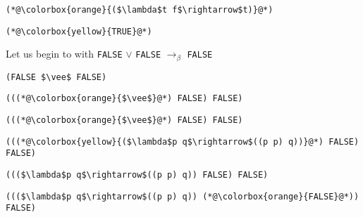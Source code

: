 \documentclass{beamer}
\begin{document}
\begin{frame}[fragile]{\CurrentSection}
\lstset{basicstyle=\ttfamily\small}\lstset{numbers=none}\lstset{language=ML}\begin{lstlisting}
(*@\colorbox{orange}{($\lambda$t f$\rightarrow$t)}@*)
\end{lstlisting}
\pause\lstset{language=ML}\begin{lstlisting}
(*@\colorbox{yellow}{TRUE}@*)
\end{lstlisting}

\end{frame}

\begin{frame}[fragile]{\CurrentSection}
\begin{block}{\CurrentSubSection}
Let us begin to with \texttt{FALSE} $\vee$ \texttt{FALSE} $\rightarrow_\beta$ \texttt{FALSE}
\end{block}


\end{frame}

\begin{frame}[fragile]{\CurrentSection}
\lstset{basicstyle=\ttfamily\small}\lstset{numbers=none}\lstset{language=ML}\begin{lstlisting}
(FALSE $\vee$ FALSE)
\end{lstlisting}
\pause\lstset{language=ML}\begin{lstlisting}
(((*@\colorbox{orange}{$\vee$}@*) FALSE) FALSE)
\end{lstlisting}

\end{frame}

\begin{frame}[fragile]{\CurrentSection}
\lstset{basicstyle=\ttfamily\small}\lstset{numbers=none}\lstset{language=ML}\begin{lstlisting}
(((*@\colorbox{orange}{$\vee$}@*) FALSE) FALSE)
\end{lstlisting}
\pause\lstset{language=ML}\begin{lstlisting}
(((*@\colorbox{yellow}{($\lambda$p q$\rightarrow$((p p) q))}@*) FALSE) FALSE)
\end{lstlisting}

\end{frame}

\begin{frame}[fragile]{\CurrentSection}
\lstset{basicstyle=\ttfamily\small}\lstset{numbers=none}\lstset{language=ML}\begin{lstlisting}
((($\lambda$p q$\rightarrow$((p p) q)) FALSE) FALSE)
\end{lstlisting}
\pause\lstset{language=ML}\begin{lstlisting}
((($\lambda$p q$\rightarrow$((p p) q)) (*@\colorbox{orange}{FALSE}@*)) FALSE)
\end{lstlisting}

\end{frame}
\end{document}
